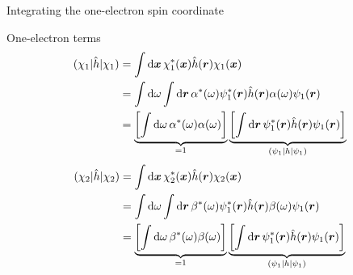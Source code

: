 \documentclass[aspectratio=169,9pt]{beamer}
\newcommand{\br}{\boldsymbol{r}}
\newcommand{\bx}{\boldsymbol{x}}
\newcommand{\hh}{\hat{h}}
\begin{document}
\begin{frame}{Integrating the one-electron spin coordinate}
	\small
	\begin{block}{One-electron terms}
		\begin{equation*}
		\begin{split}
			(\chi_1|\hh|\chi_1)
			& = \int \dd{\bx} \chi_1^*(\bx) \hh(\br) \chi_1(\bx)
			\\
			& = \int \dd{\omega} \int \dd{\br} \alpha^*(\omega) \psi_1^*(\br) \hh(\br) \alpha(\omega) \psi_1(\br)
			\\
			& = \underbrace{\qty[ \int \dd{\omega} \alpha^*(\omega) \alpha(\omega)]}_{=1} 
			\underbrace{\qty[ \int \dd{\br} \psi_1^*(\br) \hh(\br) \psi_1(\br) ]}_{(\psi_1|h|\psi_1)}
		\end{split}
		\end{equation*}
		\begin{equation*}
		\begin{split}
			(\chi_2|\hh|\chi_2) 
			& = \int \dd{\bx} \chi_2^*(\bx) \hh(\br) \chi_2(\bx) 
			\\
			& = \int \dd{\omega} \int \dd{\br} \beta^*(\omega) \psi_1^*(\br) \hh(\br) \beta(\omega) \psi_1(\br) 
			\\
			& = \underbrace{\qty[ \int \dd{\omega} \beta^*(\omega) \beta(\omega)]}_{=1} 
			\underbrace{\qty[ \int \dd{\br} \psi_1^*(\br) \hh(\br) \psi_1(\br) ]}_{(\psi_1|h|\psi_1)}
		\end{split}
		\end{equation*}
	\end{block}
\end{frame}
\end{document}
